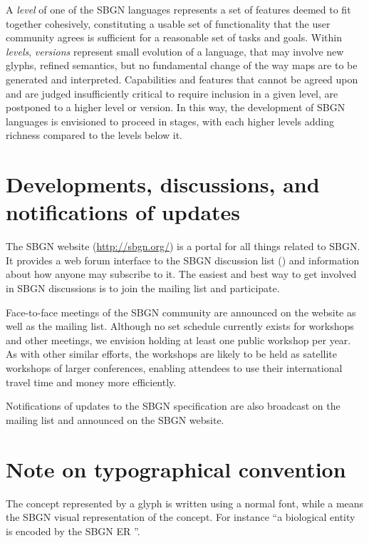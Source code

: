 A \emph{level} of one of the SBGN languages represents a set of features deemed to fit together cohesively, constituting a usable set of functionality that the user community agrees is sufficient for a reasonable set of tasks and goals.  Within \emph{levels}, \emph{versions} represent small evolution of a language, that may involve new glyphs, refined semantics, but no fundamental change of the way maps are to be generated and interpreted. Capabilities and features that cannot be agreed upon and are judged insufficiently critical to require inclusion in a given level, are postponed to a higher level or version.  In this way, the development of SBGN languages is envisioned to proceed in stages, with each higher levels adding richness compared to the levels below it.

\section{Developments, discussions, and notifications of updates}
\label{sec:discussions}

The SBGN website (\url{http://sbgn.org/}) is a portal for all things related to SBGN.  It provides a web forum interface to the SBGN discussion list () and information about how anyone may subscribe to it.  The easiest and best way to get involved in SBGN discussions is to join the mailing list and participate.

Face-to-face meetings of the SBGN community are announced on the website as well as the mailing list.  Although no set schedule currently exists for workshops and other meetings, we envision holding at least one public workshop per year.  As with other similar efforts, the workshops are likely to be held as satellite workshops of larger conferences, enabling attendees to use their international travel time and money more efficiently.

Notifications of updates to the SBGN specification are also broadcast on the mailing list and announced on the SBGN website.

\section{Note on typographical convention}
The concept represented by a glyph is written using a normal font, while a  means the SBGN visual representation of the concept. For instance ``a biological entity is encoded by the SBGN ER ''. 
